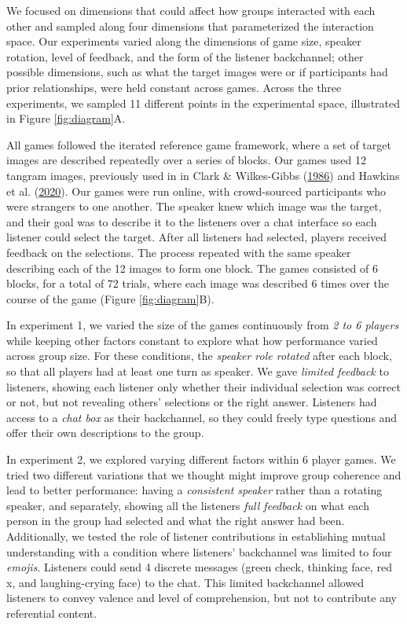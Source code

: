 \documentclass[
  english,
  a4paper,
]{article}
\begin{document}
We focused on dimensions that could affect how groups interacted with each other and sampled along four dimensions that parameterized the interaction space. Our experiments varied along the dimensions of game size, speaker rotation, level of feedback, and the form of the listener backchannel; other possible dimensions, such as what the target images were or if participants had prior relationships, were held constant across games. Across the three experiments, we sampled 11 different points in the experimental space, illustrated in Figure \ref{fig:diagram}A.

All games followed the iterated reference game framework, where a set of target images are described repeatedly over a series of blocks. Our games used 12 tangram images, previously used in in Clark \& Wilkes-Gibbs (\protect\hyperlink{ref-clark1986}{1986}) and Hawkins et al. (\protect\hyperlink{ref-hawkins2020}{2020}). Our games were run online, with crowd-sourced participants who were strangers to one another. The speaker knew which image was the target, and their goal was to describe it to the listeners over a chat interface so each listener could select the target. After all listeners had selected, players received feedback on the selections. The process repeated with the same speaker describing each of the 12 images to form one block. The games consisted of 6 blocks, for a total of 72 trials, where each image was described 6 times over the course of the game (Figure \ref{fig:diagram}B).

In experiment 1, we varied the size of the games continuously from \emph{2 to 6 players} while keeping other factors constant to explore what how performance varied across group size. For these conditions, the \emph{speaker role rotated} after each block, so that all players had at least one turn as speaker. We gave \emph{limited feedback} to listeners, showing each listener only whether their individual selection was correct or not, but not revealing others' selections or the right answer. Listeners had access to a \emph{chat box} as their backchannel, so they could freely type questions and offer their own descriptions to the group.

In experiment 2, we explored varying different factors within 6 player games. We tried two different variations that we thought might improve group coherence and lead to better performance: having a \emph{consistent speaker} rather than a rotating speaker, and separately, showing all the listeners \emph{full feedback} on what each person in the group had selected and what the right answer had been. Additionally, we tested the role of listener contributions in establishing mutual understanding with a condition where listeners' backchannel was limited to four \emph{emojis}. Listeners could send 4 discrete messages (green check, thinking face, red x, and laughing-crying face) to the chat. This limited backchannel allowed listeners to convey valence and level of comprehension, but not to contribute any referential content.
\end{document}
